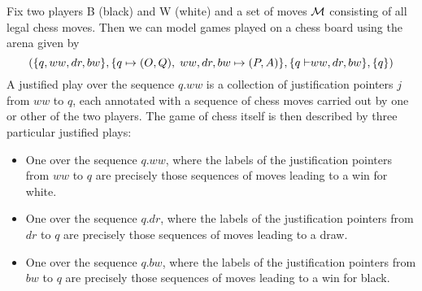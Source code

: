 \documentclass{article}
\begin{document}
\begin{example}
  Fix two players B (black) and W (white) and a set of moves $\mathcal M$ consisting of all legal chess moves.  
  Then we can model games played on a chess board using the arena given by
  \[
    (\{q,ww,dr,bw\}, \{q\mapsto(O,Q),\;ww,dr,bw\mapsto(P,A)\},\{q{\;\vdash} ww,dr,bw\}, \{q\})
    \]
  A justified play over the sequence $q.ww$ is a collection of justification pointers $j$ from $ww$ to $q$, each annotated with a sequence of chess moves carried out by one or other of the two players.  
  The game of chess itself is then described by three particular justified plays:
  \begin{itemize}
    \item One over the sequence $q.ww$, where the labels of the justification pointers from $ww$ to $q$ are precisely those sequences of moves leading to a win for white.
    \item One over the sequence $q.dr$, where the labels of the justification pointers from $dr$ to $q$ are precisely those sequences of moves leading to a draw.
    \item One over the sequence $q.bw$, where the labels of the justification pointers from $bw$ to $q$ are precisely those sequences of moves leading to a win for black.
  \end{itemize}
\end{example}




\end{document}

